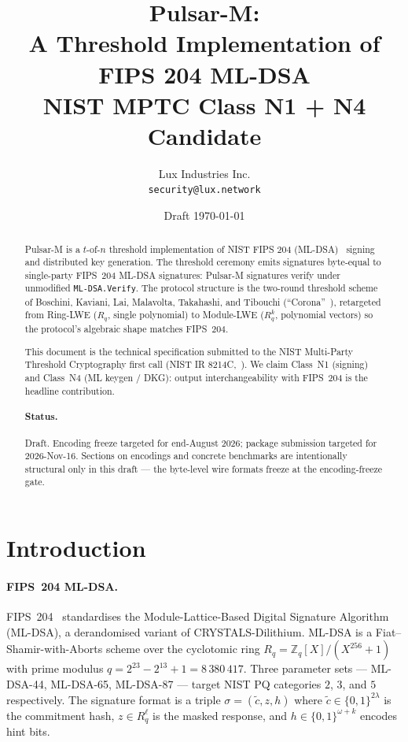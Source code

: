 \documentclass[11pt,a4paper]{article}
\title{Pulsar-M:\\
       \large A Threshold Implementation of FIPS 204 ML-DSA\\
       NIST MPTC Class N1 + N4 Candidate}
\author{Lux Industries Inc.\\
        \texttt{security@lux.network}}
\date{Draft \today}
\theoremstyle{definition}
\theoremstyle{remark}
\newcommand{\Rq}{R_q}
\newcommand{\Zq}{\mathbb{Z}_q}
\begin{document}
\maketitle

\begin{abstract}
Pulsar-M is a $t$-of-$n$ threshold implementation of NIST FIPS 204
(ML-DSA)~\cite{nist-fips204} signing and distributed key generation.
The threshold ceremony emits signatures byte-equal to single-party
FIPS~204 ML-DSA signatures: Pulsar-M signatures verify under
unmodified \texttt{ML-DSA.Verify}. The protocol structure is the
two-round threshold scheme of Boschini, Kaviani, Lai, Malavolta,
Takahashi, and Tibouchi (``Corona''~\cite{boschini2024corona}), retargeted
from Ring-LWE ($\Rq$, single polynomial) to Module-LWE ($\Rq^k$,
polynomial vectors) so the protocol's algebraic shape matches
FIPS~204.

This document is the technical specification submitted to the NIST
Multi-Party Threshold Cryptography first call (NIST IR
8214C,~\cite{nist-ir-8214c}). We claim Class~N1 (signing) and Class~N4
(ML keygen / DKG): output interchangeability with FIPS~204 is the
headline contribution.

\paragraph{Status.} Draft. Encoding freeze targeted for end-August
2026; package submission targeted for 2026-Nov-16. Sections on
encodings and concrete benchmarks are intentionally structural only
in this draft --- the byte-level wire formats freeze at the
encoding-freeze gate.
\end{abstract}

\tableofcontents

\section{Introduction}

\paragraph{FIPS~204 ML-DSA.}
FIPS~204~\cite{nist-fips204} standardises the Module-Lattice-Based
Digital Signature Algorithm (ML-DSA), a derandomised variant of
CRYSTALS-Dilithium. ML-DSA is a Fiat--Shamir-with-Aborts scheme over
the cyclotomic ring $\Rq = \Zq[X]/(X^{256}+1)$ with prime modulus
$q = 2^{23} - 2^{13} + 1 = 8\,380\,417$. Three parameter sets ---
ML-DSA-44, ML-DSA-65, ML-DSA-87 --- target NIST PQ categories
$2$, $3$, and $5$ respectively. The signature format is a triple
$\sigma = (\tilde c, z, h)$ where $\tilde c \in \{0,1\}^{2\lambda}$
is the commitment hash, $z \in \Rq^\ell$ is the masked response, and
$h \in \{0,1\}^{\omega + k}$ encodes hint bits.
\end{document}
